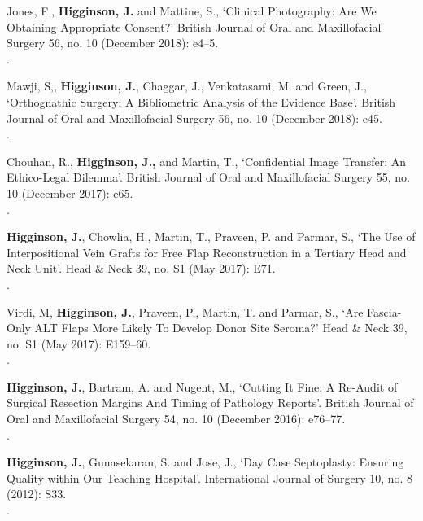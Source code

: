  Jones, F., \textbf{Higginson, J.} and Mattine, S., `Clinical Photography: Are We Obtaining Appropriate Consent?’ British Journal of Oral and Maxillofacial Surgery 56, no. 10 (December 2018): e4–5. 
\\.

\vspace{0.1cm}

 Mawji, S,, \textbf{Higginson, J.}, Chaggar, J.,  Venkatasami, M. and Green, J., `Orthognathic Surgery: A Bibliometric Analysis of the Evidence Base’. British Journal of Oral and Maxillofacial Surgery 56, no. 10 (December 2018): e45. 
\\.

\vspace{0.1cm}

 Chouhan, R., \textbf{Higginson, J.,} and Martin, T., `Confidential Image Transfer: An Ethico-Legal Dilemma’. British Journal of Oral and Maxillofacial Surgery 55, no. 10 (December 2017): e65.
\\.

\vspace{0.1cm}

 \textbf{Higginson, J.}, Chowlia, H., Martin, T., Praveen, P. and Parmar, S., `The Use of Interpositional Vein Grafts for Free Flap Reconstruction in a Tertiary Head and Neck Unit’. Head \& Neck 39, no. S1 (May 2017): E71. 
\\.

\vspace{0.1cm}

 Virdi, M, \textbf{Higginson, J.}, Praveen, P., Martin, T. and Parmar, S., `Are Fascia-Only ALT Flaps More Likely To Develop Donor Site Seroma?’ Head \& Neck 39, no. S1 (May 2017): E159–60. 
\\.

\vspace{0.1cm}

 \textbf{Higginson, J.}, Bartram, A. and Nugent, M., `Cutting It Fine: A Re-Audit of Surgical Resection Margins And Timing of Pathology Reports’. British Journal of Oral and Maxillofacial Surgery 54, no. 10 (December 2016): e76–77. 
\\.

\vspace{0.1cm}

 \textbf{Higginson, J.}, Gunasekaran, S. and Jose, J., `Day Case Septoplasty: Ensuring Quality within Our Teaching Hospital’. International Journal of Surgery 10, no. 8 (2012): S33. 
\\.



